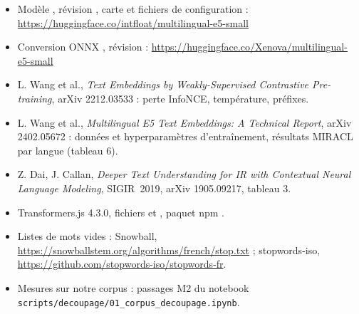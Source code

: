 \begingroup\raggedright\small
\begin{itemize}
\item Modèle , révision , carte et fichiers de configuration :
  \url{https://huggingface.co/intfloat/multilingual-e5-small}
\item Conversion ONNX , révision  :
  \url{https://huggingface.co/Xenova/multilingual-e5-small}
\item L. Wang et al., \emph{Text Embeddings by Weakly-Supervised Contrastive Pre-training}, arXiv 2212.03533 :
  perte InfoNCE, température, préfixes.
\item L. Wang et al., \emph{Multilingual E5 Text Embeddings: A Technical Report}, arXiv 2402.05672 : données et
  hyperparamètres d'entraînement, résultats MIRACL par langue (tableau 6).
\item Z. Dai, J. Callan, \emph{Deeper Text Understanding for IR with Contextual Neural Language Modeling}, SIGIR~2019,
  arXiv 1905.09217, tableau 3.
\item Transformers.js 4.3.0, fichiers  et ,
  paquet npm .
\item Listes de mots vides : Snowball, \url{https://snowballstem.org/algorithms/french/stop.txt} ; stopwords-iso,
  \url{https://github.com/stopwords-iso/stopwords-fr}.
\item Mesures sur notre corpus : passages M2 du notebook \nolinkurl{scripts/decoupage/01_corpus_decoupage.ipynb}.
\end{itemize}
\endgroup



